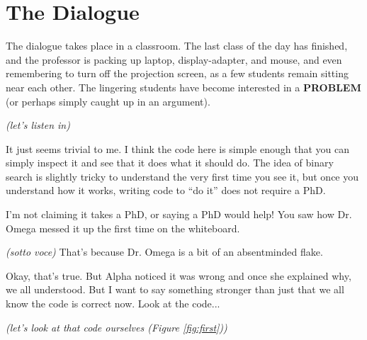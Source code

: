 \documentclass[sigplan]{acmart}
\begin{document}
\maketitle


\section{The Dialogue}

The dialogue takes place in a classroom.  The last class of the day
has finished, and the professor is packing up laptop, 
display-adapter, and mouse, and even remembering to turn off the projection screen, as a few students remain sitting near each other.  The lingering students have become interested in a {\bf PROBLEM} (or perhaps simply caught up in an argument).

\vspace{0.1in}

\emph{(let's listen in)}

\vspace{0.1in}

  It just seems trivial to me.  I think the code here is simple enough that you can simply inspect it and see that it does what it should do.  The idea of binary search is slightly tricky to understand the very first time you see it, but once you understand how it works, writing code to ``do it'' does not require a PhD.

\vspace{0.1in}

  I'm not claiming it takes a PhD, or saying a PhD would help!  You saw how Dr. Omega messed it up the first time on the whiteboard.

\vspace{0.1in}

 \emph{(sotto voce)} That's because
Dr. Omega is a bit of an absentminded flake.

\vspace{0.1in}

  Okay, that's true.  But Alpha noticed it
was wrong and once she explained why, we all understood.  But I want
to say something stronger than just that we all know the code is
correct now.  Look at the code...

\vspace{0.1in}

\emph{(let's look at that code ourselves (Figure \ref{fig:first}))}
\end{document}

